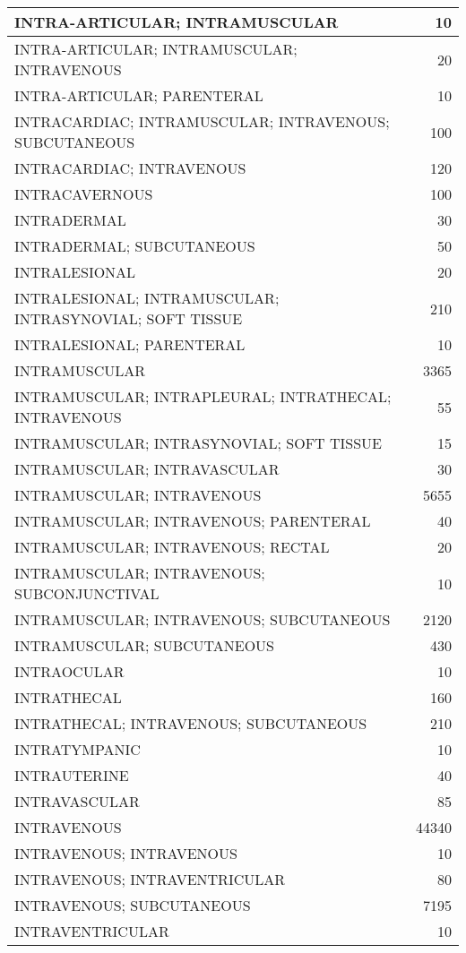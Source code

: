 \documentclass[
]{article}
\begin{document}
\begin{table}
\begin{tabular}[t]{l|r}
\hline
INTRA-ARTICULAR; INTRAMUSCULAR & 10\\
\hline
INTRA-ARTICULAR; INTRAMUSCULAR; INTRAVENOUS & 20\\
\hline
INTRA-ARTICULAR; PARENTERAL & 10\\
\hline
INTRACARDIAC; INTRAMUSCULAR; INTRAVENOUS; SUBCUTANEOUS & 100\\
\hline
INTRACARDIAC; INTRAVENOUS & 120\\
\hline
INTRACAVERNOUS & 100\\
\hline
INTRADERMAL & 30\\
\hline
INTRADERMAL; SUBCUTANEOUS & 50\\
\hline
INTRALESIONAL & 20\\
\hline
INTRALESIONAL; INTRAMUSCULAR; INTRASYNOVIAL; SOFT TISSUE & 210\\
\hline
INTRALESIONAL; PARENTERAL & 10\\
\hline
INTRAMUSCULAR & 3365\\
\hline
INTRAMUSCULAR; INTRAPLEURAL; INTRATHECAL; INTRAVENOUS & 55\\
\hline
INTRAMUSCULAR; INTRASYNOVIAL; SOFT TISSUE & 15\\
\hline
INTRAMUSCULAR; INTRAVASCULAR & 30\\
\hline
INTRAMUSCULAR; INTRAVENOUS & 5655\\
\hline
INTRAMUSCULAR; INTRAVENOUS; PARENTERAL & 40\\
\hline
INTRAMUSCULAR; INTRAVENOUS; RECTAL & 20\\
\hline
INTRAMUSCULAR; INTRAVENOUS; SUBCONJUNCTIVAL & 10\\
\hline
INTRAMUSCULAR; INTRAVENOUS; SUBCUTANEOUS & 2120\\
\hline
INTRAMUSCULAR; SUBCUTANEOUS & 430\\
\hline
INTRAOCULAR & 10\\
\hline
INTRATHECAL & 160\\
\hline
INTRATHECAL; INTRAVENOUS; SUBCUTANEOUS & 210\\
\hline
INTRATYMPANIC & 10\\
\hline
INTRAUTERINE & 40\\
\hline
INTRAVASCULAR & 85\\
\hline
INTRAVENOUS & 44340\\
\hline
INTRAVENOUS; INTRAVENOUS & 10\\
\hline
INTRAVENOUS; INTRAVENTRICULAR & 80\\
\hline
INTRAVENOUS; SUBCUTANEOUS & 7195\\
\hline
INTRAVENTRICULAR & 10\\

\end{tabular}
\end{table}
\end{document}
